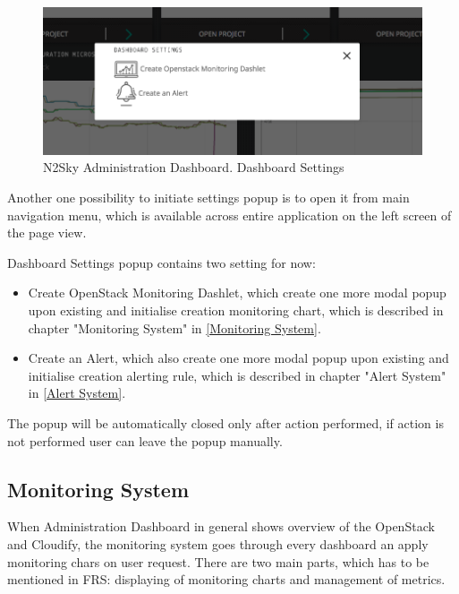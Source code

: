 \begin{figure}[htbp]
\begin{center}
  \includegraphics[width=\linewidth]{components/4/pics/dashboard_settings.png}
  \caption{N2Sky Administration Dashboard. Dashboard Settings}
  \label{fig:dashboard_settings}
\end{center}
\end{figure}

Another one possibility to initiate settings popup is to open it from main navigation menu, which is available across entire application on the left screen of the page view. 

Dashboard Settings popup contains two setting for now:
\begin{itemize}
\item Create OpenStack Monitoring Dashlet, which create one more modal popup upon existing and initialise creation monitoring chart, which is described in chapter "Monitoring System" in \autoref{Monitoring System}.
\item Create an Alert, which also create one more modal popup upon existing and initialise creation alerting rule, which is described in chapter "Alert System" in \autoref{Alert System}.
\end{itemize}

The popup will be automatically closed only after action performed, if action is not performed user can leave the popup manually.



\subsection{Monitoring System}\label{Monitoring System}

When Administration Dashboard in general shows overview of the OpenStack and Cloudify, the monitoring system goes through every dashboard an apply monitoring chars on user request. There are two main parts, which has to be mentioned in FRS: displaying of monitoring charts and management of metrics.
 
